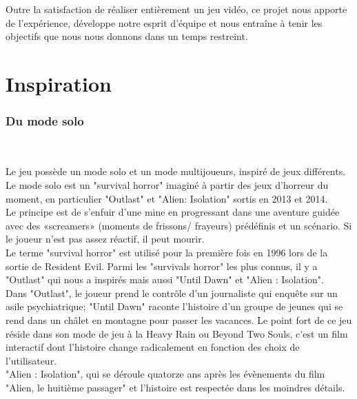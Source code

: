 \documentclass[titlepage, 13px, a4paper]{article}
\begin{document}
\paragraph{} \hspace{0pt} \\
Outre la satisfaction de réaliser entièrement un jeu vidéo, ce projet nous apporte de l'expérience, développe notre esprit d'équipe et nous entraîne à tenir les objectifs que nous nous donnons dans un temps restreint. 

\newpage

\part{Inspiration}
\section{Du mode solo}
\paragraph{} \hspace{0pt} \\
Le jeu possède un mode solo et un mode multijoueurs, inspiré de jeux différents. 
Le mode solo est un "survival horror" imaginé à partir des jeux d'horreur du moment, 
en particulier "Outlast" et "Alien: Isolation" sortis en 2013 et 2014. 
\\
Le principe est de s'enfuir d'une mine en progressant dans une aventure guidée 
avec des «screamers» (moments de frissons/ frayeurs) prédéfinis et un scénario. 
Si le joueur n'est pas assez réactif, il peut mourir.
\\
Le terme "survival horror" est utilisé pour la première fois en 1996 lors de la sortie 
de Resident Evil. Parmi les "survivals horror" les plus connus, il y a "Outlast" qui 
nous a inspirés mais aussi "Until Dawn" et "Alien : Isolation". 
\\
Dans "Outlast", le joueur prend le contrôle d'un journaliste qui enquête sur un asile psychiatrique; 
"Until Dawn" raconte l'histoire d'un groupe de jeunes qui se rend dans un châlet 
en montagne pour passer les vacances. Le point fort de ce jeu réside dans son mode 
de jeu à la Heavy Rain ou Beyond Two Souls, c'est un film interactif dont l'histoire 
change radicalement en fonction des choix de l'utilisateur. 
\\
"Alien : Isolation", qui se déroule quatorze ans après les évènements du film "Alien, le huitième passager" 
et l'histoire est respectée dans les moindres détails. 
\end{document}
